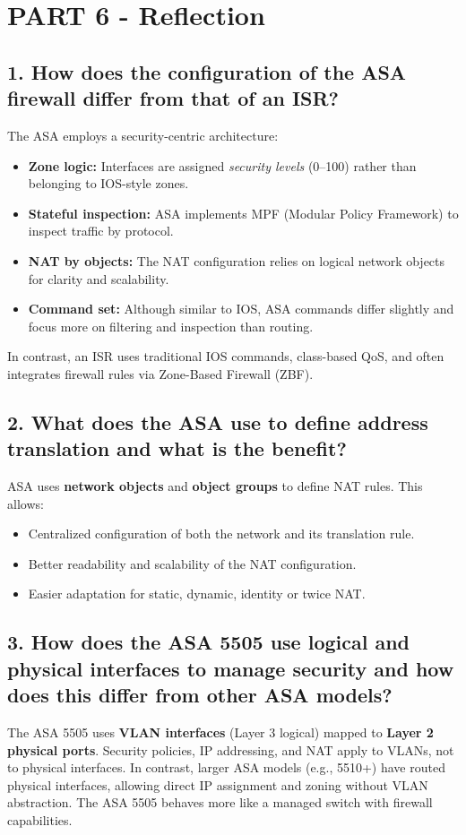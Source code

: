 \documentclass[a4paper,11pt]{article}
\begin{document}
\section*{PART 6 - Reflection}

\subsection*{1. How does the configuration of the ASA firewall differ from that of an ISR?}
The ASA employs a security-centric architecture:
\begin{itemize}
    \item \textbf{Zone logic:} Interfaces are assigned \textit{security levels} (0–100) rather than belonging to IOS-style zones.
    \item \textbf{Stateful inspection:} ASA implements MPF (Modular Policy Framework) to inspect traffic by protocol.
    \item \textbf{NAT by objects:} The NAT configuration relies on logical network objects for clarity and scalability.
    \item \textbf{Command set:} Although similar to IOS, ASA commands differ slightly and focus more on filtering and inspection than routing.
\end{itemize}

In contrast, an ISR uses traditional IOS commands, class-based QoS, and often integrates firewall rules via Zone-Based Firewall (ZBF).

\subsection*{2. What does the ASA use to define address translation and what is the benefit?}
ASA uses \textbf{network objects} and \textbf{object groups} to define NAT rules. This allows:
\begin{itemize}
    \item Centralized configuration of both the network and its translation rule.
    \item Better readability and scalability of the NAT configuration.
    \item Easier adaptation for static, dynamic, identity or twice NAT.
\end{itemize}

\subsection*{3. How does the ASA 5505 use logical and physical interfaces to manage security and how does this differ from other ASA models?}
The ASA 5505 uses \textbf{VLAN interfaces} (Layer 3 logical) mapped to \textbf{Layer 2 physical ports}. Security policies, IP addressing, and NAT apply to VLANs, not to physical interfaces. In contrast, larger ASA models (e.g., 5510+) have routed physical interfaces, allowing direct IP assignment and zoning without VLAN abstraction. The ASA 5505 behaves more like a managed switch with firewall capabilities.
\end{document}
